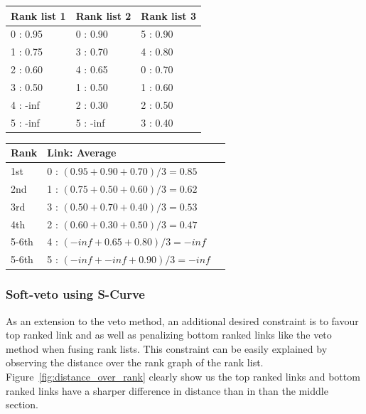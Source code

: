 \begin{example}
  \begin{subexample}{\linewidth}
    \centering
    \begin{tabular}{l l l}
      \toprule
      Rank list 1 & Rank list 2 & Rank list 3 \\
      \midrule
      0 : 0.95    & 0 : 0.90    & 5 : 0.90 \\
      1 : 0.75    & 3 : 0.70    & 4 : 0.80 \\
      2 : 0.60    & 4 : 0.65    & 0 : 0.70 \\
      3 : 0.50    & 1 : 0.50    & 1 : 0.60 \\
      4 : -inf    & 2 : 0.30    & 2 : 0.50 \\
      5 : -inf    & 5 : -inf    & 3 : 0.40 \\
      \bottomrule
    \end{tabular}
  \end{subexample}

  \vspace{0.5cm}

  \begin{subexample}{\linewidth}
    \centering
    \begin{tabular}{l l l}
      \toprule
      Rank & Link: Average \\
      \midrule
      1st & 0 : $(0.95 + 0.90 + 0.70)/3 = 0.85$ \\
      2nd & 1 : $(0.75 + 0.50 + 0.60)/3 = 0.62$ \\
      3rd & 3 : $(0.50 + 0.70 + 0.40)/3 = 0.53$ \\
      4th & 2 : $(0.60 + 0.30 + 0.50)/3 = 0.47$ \\
      5-6th & 4 : $(-inf + 0.65 + 0.80)/3 = -inf$ \\
      5-6th & 5 : $(-inf + -inf + 0.90)/3 = -inf$ \\
      \bottomrule
    \end{tabular}
  \end{subexample}
\end{example}

\subsubsection{Soft-veto using S-Curve}

As an extension to the veto method, an additional desired constraint is to favour top ranked link and as well as penalizing bottom ranked links like the veto method when fusing rank lists.
This constraint can be easily explained by observing the distance over the rank graph of the rank list.
Figure~\ref{fig:distance_over_rank} clearly show us the top ranked links and bottom ranked links have a sharper difference in distance than in than the middle section.

